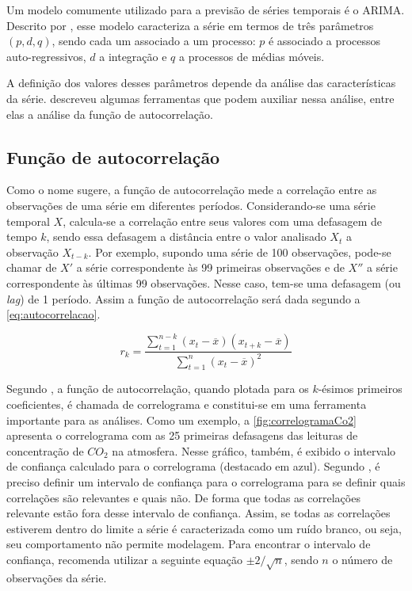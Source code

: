\documentclass[
    12pt,
    oneside,
    a4paper,
    english,
    brazil
]{abntex2}
\begin{document}
Um modelo comumente utilizado para a  previsão de séries temporais é o ARIMA\@.
Descrito por  , esse  modelo caracteriza a  série em  termos de
três  parâmetros $(p,d,q)$,  sendo  cada  um associado  a  um  processo: $p$  é
associado a processos  auto-regressivos, $d$ a integração e $q$  a processos de
médias móveis.

A   definição  dos   valores   desses  parâmetros   depende   da  análise   das
características da  série.   descreveu algumas  ferramentas que
podem auxiliar nessa análise, entre elas a análise da função de autocorrelação.

\subsection{Função de autocorrelação}\label{sec:corre}

Como  o nome  sugere, a  função de  autocorrelação mede  a correlação  entre as
observações  de uma  série em  diferentes períodos.  Considerando-se uma  série
temporal $X$, calcula-se  a correlação entre seus valores com  uma defasagem de
tempo $k$,  sendo essa defasagem  a distância entre  o valor analisado  $X_t$ a
observação  $X_{t-k}$.  Por exemplo,  supondo  uma  série de  100  observações,
pode-se chamar de $X'$ a série  correspondente às 99 primeiras observações e de
$X''$ a série correspondente às últimas  99 observações. Nesse caso, tem-se uma
defasagem (ou \textit{lag})  de 1 período. Assim a função  de autocorrelação será
dada segundo a \autoref{eq:autocorrelacao}.

\begin{equation}
    \label{eq:autocorrelacao}
    r_k = \frac{\sum_{t=1}^{n-k}{(x_t - \overline{x})(x_{t+k} -
    \overline{x})}}{\sum_{t=1}^{n}{(x_t - \overline{x})^2}}
\end{equation}

Segundo  ,  a  função   de  autocorrelação,  quando  plotada
para  os  $k$-ésimos  primeiros  coeficientes,  é  chamada  de  correlograma  e
constitui-se em uma ferramenta importante para  as análises. Como um exemplo, a
\autoref{fig:correlogramaCo2}  apresenta o  correlograma  com  as 25  primeiras
defasagens das leituras de concentração  de $CO_2$ na atmosfera. Nesse gráfico,
também, é  exibido o  intervalo  de  confiança  calculado para  o  correlograma
(destacado  em  azul).  Segundo   ,  é  preciso  definir  um
intervalo de  confiança para o  correlograma para se definir  quais correlações
são relevantes e  quais não. De forma que todas  as correlações relevante estão
fora desse  intervalo de  confiança. Assim, se  todas as  correlações estiverem
dentro do  limite a série  é caracterizada como um  ruído branco, ou  seja, seu
comportamento não permite  modelagem. Para encontrar o  intervalo de confiança,
 recomenda utilizar a seguinte equação $\pm{}2/\sqrt{n}$,
sendo $n$ o número de observações da série.
\end{document}
